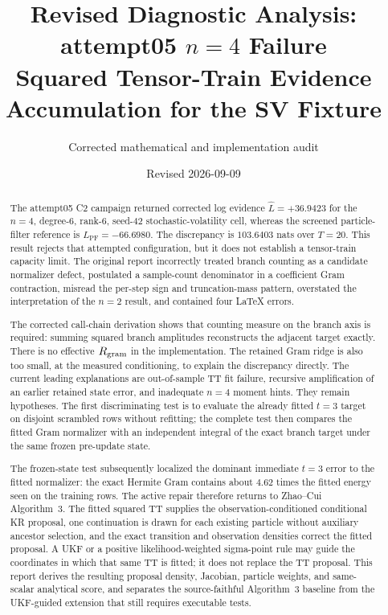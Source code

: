 \documentclass[11pt]{article}
\title{Revised Diagnostic Analysis: attempt05 $n=4$ Failure\\
\large Squared Tensor-Train Evidence Accumulation for the SV Fixture}
\author{Corrected mathematical and implementation audit}
\date{Revised 2026-09-09}
\begin{document}
\maketitle

\begin{abstract}
The attempt05 C2 campaign returned corrected log evidence
$\widehat L=+36.9423$ for the $n=4$, degree-6, rank-6, seed-42
stochastic-volatility cell, whereas the screened particle-filter reference is
$L_{\mathrm{PF}}=-66.6980$. The discrepancy is $103.6403$ nats over $T=20$.
This result rejects that attempted configuration, but it does not establish a
tensor-train capacity limit. The original report incorrectly treated branch
counting as a candidate normalizer defect, postulated a sample-count
denominator in a coefficient Gram contraction, misread the per-step sign and
truncation-mass pattern, overstated the interpretation of the $n=2$ result,
and contained four LaTeX errors.

The corrected call-chain derivation shows that counting measure on the branch
axis is required: summing squared branch amplitudes reconstructs the adjacent
target exactly. There is no effective $R_{\rm gram}$ in the implementation.
The retained Gram ridge is also too small, at the measured conditioning, to
explain the discrepancy directly. The current leading explanations are
out-of-sample TT fit failure, recursive amplification of an earlier retained
state error, and inadequate $n=4$ moment hints. They remain hypotheses. The
first discriminating test is to evaluate the already fitted $t=3$ target on
disjoint scrambled rows without refitting; the complete test then compares the
fitted Gram normalizer with an independent integral of the exact branch target
under the same frozen pre-update state.

The frozen-state test subsequently localized the dominant immediate $t=3$
error to the fitted normalizer: the exact Hermite Gram contains about $4.62$
times the fitted energy seen on the training rows.  The active repair therefore
returns to Zhao--Cui Algorithm~3.  The fitted squared TT supplies the
observation-conditioned conditional KR proposal, one continuation is drawn for
each existing particle without auxiliary ancestor selection, and the exact
transition and observation densities correct the fitted proposal.  A UKF or a
positive likelihood-weighted sigma-point rule may guide the coordinates in
which that same TT is fitted; it does not replace the TT proposal.  This report
derives the resulting proposal density, Jacobian, particle weights, and
same-scalar analytical score, and separates the source-faithful Algorithm~3
baseline from the UKF-guided extension that still requires executable tests.
\end{abstract}
\end{document}

